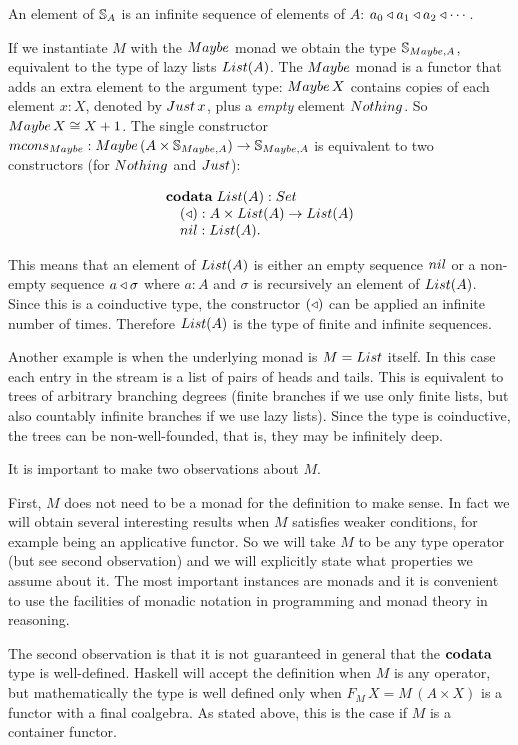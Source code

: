 An element of $\mathbb{S}_{A}$ is an infinite sequence of elements of $A$: $a_0 \triangleleft a_1\triangleleft a_2\triangleleft \cdots$.




If we instantiate $M$ with the $\maybe$ monad we obtain the type $\stream{\maybe,A}$, equivalent to the type of lazy lists $\lst{A}$.
The $\maybe$ monad is a functor that adds an extra element to the argument type:
$\maybe\,X$ contains copies of each element $x:X$, denoted by $\just\,x$, plus a {\em empty} element $\nothing$.
So $\maybe\,X \cong X+1$.
The single constructor $\mcons_\maybe: \maybe\,(A\times \stream{\maybe,A})\rightarrow\stream{\maybe,A}$ is equivalent to two constructors (for $\nothing$ and $\just$):

$$
\begin{array}[t]{l}
\codata\;
\lst{A}:\set\\
\quad (\scons): A\times \lst{A}\rightarrow\lst{A}\\
\quad \nil: \lst{A}.
\end{array}
$$

This means that an element of $\lst{A}$ is either an empty sequence $\nil$ or a non-empty sequence $a\triangleleft \sigma$ where $a:A$ and $\sigma$ is recursively an element of $\lst{A}$.
Since this is a coinductive type, the constructor $(\triangleleft)$ can be applied an infinite number of times.
Therefore $\lst{A}$ is the type of finite and infinite sequences.

Another example is when the underlying monad is $M = \lstsym $ itself.
In this case each entry in the stream is a list of pairs of heads and tails.
This is equivalent to trees of arbitrary branching degrees (finite branches if we use only finite lists, but also countably infinite branches if we use lazy lists).
Since the type is coinductive, the trees can be non-well-founded, that is, they may be infinitely deep.


It is important to make two observations about $M$.

First, $M$ does not need to be a monad for the definition to make sense. 
In fact we will obtain several interesting results when $M$ satisfies weaker conditions, for example being an applicative functor.
So we will take $M$ to be any type operator (but see second observation) and we will explicitly state what properties we assume about it.
The most important instances are monads and it is convenient to use the facilities of monadic notation in programming and monad theory in reasoning.

The second observation is that it is not guaranteed in general that the $\mathbf{codata}$ type is well-defined.
Haskell will accept the definition when $M$ is any operator, but mathematically the type is well defined only when $F_M\,X = M\,(A\times X)$ is a functor with a final coalgebra.
As stated above, this is the case if $M$ is a container functor.

